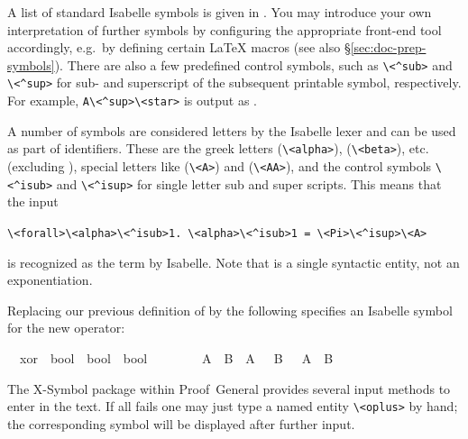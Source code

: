 \begin{isabellebody}
\begin{isamarkuptext}
  A list of standard Isabelle symbols is given in
  \cite[appendix~A]{isabelle-sys}.  You may introduce your own
  interpretation of further symbols by configuring the appropriate
  front-end tool accordingly, e.g.\ by defining certain {\LaTeX}
  macros (see also \S\ref{sec:doc-prep-symbols}).  There are also a
  few predefined control symbols, such as \verb,\,\verb,<^sub>, and
  \verb,\,\verb,<^sup>, for sub- and superscript of the subsequent
  printable symbol, respectively.  For example, \verb,A\<^sup>\<star>, is
  output as .

  A number of symbols are considered letters by the Isabelle lexer and
  can be used as part of identifiers. These are the greek letters
  \isa{{\isasymalpha}} (\verb+\+\verb+<alpha>+), \isa{{\isasymbeta}}
  (\verb+\+\verb+<beta>+), etc. (excluding \isa{{\isasymlambda}}),
  special letters like \isa{{\isasymA}} (\verb+\+\verb+<A>+) and \isa{{\isasymAA}} (\verb+\+\verb+<AA>+), and the control symbols
  \verb+\+\verb+<^isub>+ and \verb+\+\verb+<^isup>+ for single letter
  sub and super scripts. This means that the input

  \medskip
  {\small\noindent \verb,\,\verb,<forall>\,\verb,<alpha>\<^isub>1.,~\verb,\,\verb,<alpha>\<^isub>1 = \,\verb,<Pi>\<^isup>\<A>,}

  \medskip
  \noindent is recognized as the term  
  by Isabelle. Note that \isa{{\isasymPi}\isactrlisup {\isasymA}} is a single
  syntactic entity, not an exponentiation.

  \medskip Replacing our previous definition of  by the
  following specifies an Isabelle symbol for the new operator:%
\end{isamarkuptext}%
\isamarkuptrue%
%
\isadelimML
%
\endisadelimML
%
\isatagML
%
\endisatagML
{\isafoldML}%
%
\isadelimML
%
\endisadelimML
{}\isamarkupfalse%
\isanewline
\ \ xor\ {\isacharcolon}{\isacharcolon}\ {\isachardoublequoteopen}bool\ {\isasymRightarrow}\ bool\ {\isasymRightarrow}\ bool{\isachardoublequoteclose}\ \ \ \ {\isacharparenleft}\ {\isachardoublequoteopen}{\isasymoplus}{\isachardoublequoteclose}\ {}{}{\isacharparenright}\isanewline
\ \ {\isachardoublequoteopen}A\ {\isasymoplus}\ B\ {\isasymequiv}\ {\isacharparenleft}A\ {\isasymand}\ {\isasymnot}\ B{\isacharparenright}\ {\isasymor}\ {\isacharparenleft}{\isasymnot}\ A\ {\isasymand}\ B{\isacharparenright}{\isachardoublequoteclose}%
\begin{isamarkuptext}%
\noindent The X-Symbol package within Proof~General provides several
  input methods to enter \isa{{\isasymoplus}} in the text.  If all fails one may
  just type a named entity \verb,\,\verb,<oplus>, by hand; the
  corresponding symbol will be displayed after further input.


\end{isamarkuptext}
\end{isabellebody}
